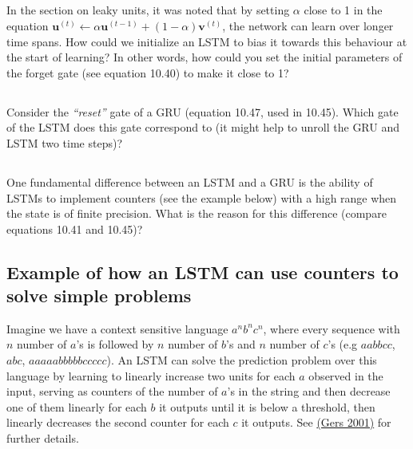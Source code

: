 \documentclass[a4paper]{report}
\renewcommand{\vec}[1]{{\boldsymbol{#1}}}
\newcommand{\tvec}[2]{{\vec{#1}^{(#2)}}}
\begin{document}
    \subsection{}
    In the section on leaky units, it was noted that by setting $\alpha$ close to 1 in the equation $\tvec{u}{t} \leftarrow \alpha \tvec{u}{t-1} + (1-\alpha)\tvec{v}{t}$, the network can learn over longer time spans. How could we initialize an LSTM to bias it towards this behaviour at the start of learning? In other words, how could you set the initial parameters of the forget gate (see equation 10.40) to make it close to 1?


    \subsection{}
    Consider the \emph{``reset''} gate of a GRU (equation 10.47, used in 10.45). Which gate of the LSTM does this gate correspond to (it might help to unroll the GRU and LSTM two time steps)?

    \subsection{}
    One fundamental difference between an LSTM and a GRU is the ability of LSTMs to implement counters (see the example below) with a high range when the state is of finite precision. What is the reason for this difference (compare equations 10.41 and 10.45)?


    \subsection*{Example of how an LSTM can use counters to solve simple problems}
    \label{csl}
    Imagine we have a context sensitive language $a^nb^nc^n$, where every sequence with $n$ number of $a$'s is followed by $n$ number of $b$'s and $n$ number of $c$'s (e.g $aabbcc$, $abc$, $aaaaabbbbbccccc$). An LSTM can solve the prediction problem over this language by learning to linearly increase two units for each $a$ observed in the input, serving as counters of the number of $a$'s in the string and then decrease one of them linearly for each $b$ it outputs until it is below a threshold, then linearly decreases the second counter for each $c$ it outputs. See \href{ftp://ftp.idsia.ch/pub/juergen/L-IEEE.pdf}{(Gers 2001)} for further details.
\end{document}
